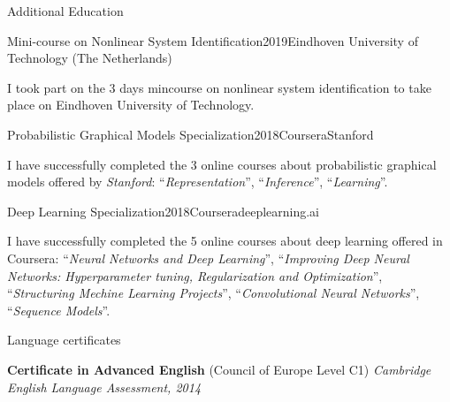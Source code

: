 \documentclass{resume} %
\begin{document}
\begin{rSection}{Additional Education}

\begin{rSubsection}{Mini-course on Nonlinear System Identification}{2019}{}{Eindhoven University of Technology (The Netherlands)}

  \item I took part on the 3 days mincourse on nonlinear system identification to take place on Eindhoven University of Technology.
\end{rSubsection}

\begin{rSubsection}{Probabilistic Graphical Models Specialization}{2018}{Coursera}{Stanford}

  \item I have successfully completed the 3 online courses about probabilistic graphical models offered by \textit{Stanford}: ``\textit{Representation}'', ``\textit{Inference}'', ``\textit{Learning}''.
\end{rSubsection}

\begin{rSubsection}{Deep Learning Specialization}{2018}{Coursera}{deeplearning.ai}

  \item I have successfully completed the 5 online courses about deep learning offered in Coursera: ``\textit{Neural Networks and Deep Learning}'', ``\textit{Improving Deep Neural Networks: Hyperparameter tuning, Regularization and Optimization}'', ``\textit{Structuring Mechine Learning Projects}'', ``\textit{Convolutional Neural Networks}'', ``\textit{Sequence Models}''.
\end{rSubsection}


\end{rSection}




\begin{rSection}{Language certificates}


{\bf Certificate in Advanced English} (Council of Europe Level C1) \hfill {\em Cambridge English Language Assessment, 2014}


\end{rSection}
\end{document}
